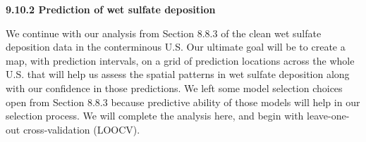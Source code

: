 \documentclass[12pt, titlepage]{article}
\begin{document}
\setcounter{equation}{0}
\renewcommand{\theequation}{R.\arabic{equation}}


%
%


{\large \flushleft \textbf{9.10.2 Prediction of wet sulfate deposition}}

\vspace{.3cm}

We continue with our analysis from Section 8.8.3 of the clean wet sulfate deposition data in the conterminous U.S.  Our ultimate goal will be to create a map, with prediction intervals, on a grid of prediction locations across the whole U.S. that will help us assess the spatial patterns in wet sulfate deposition along with our confidence in those predictions.  We left some model selection choices open from Section 8.8.3 because predictive ability of those models will help in our selection process.  We will complete the analysis here, and begin with leave-one-out cross-validation (LOOCV).
\end{document}
